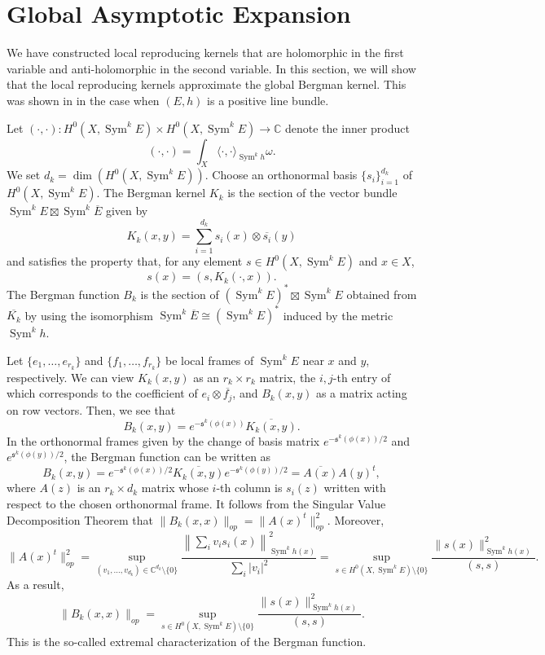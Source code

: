 \documentclass{amsart}
\theoremstyle{definition}
\theoremstyle{remark}
\numberwithin{equation}{section}
\DeclareMathOperator{\Sym}{Sym}
\begin{document}
\section{Global Asymptotic Expansion}

We have constructed local reproducing kernels that are holomorphic in the first variable and anti-holomorphic in the second variable. In this section, we will show that the local reproducing kernels approximate the global Bergman kernel. This was shown in \cite{BBS} in the case when $(E,h)$ is a positive line bundle. 

Let $(\cdot, \cdot): H^0(X,\Sym^kE) \times H^0(X,\Sym^kE) \to \mathbb{C}$ denote the inner product
$$
(\cdot, \cdot) = \int_X \langle \cdot, \cdot \rangle_{\Sym^kh} \omega.
$$
We set $d_k = \dim(H^0 (X, \Sym^k E))$. Choose an orthonormal basis $\{s_i\}_{i=1}^{d_k}$ of $H^0(X,\Sym^kE)$. The Bergman kernel $K_k$ is the section of the vector bundle $\Sym^k E \boxtimes \Sym^k \overline{E}$ given by
$$
K_k(x,y) = \sum_{i=1}^{d_k} s_i(x) \otimes \overline{s_i}(y)
$$
and satisfies the property that, for any element $s \in H^0(X,\Sym^kE)$ and $x \in X$,
$$
s(x) = (s, K_k(\cdot,x)).
$$
The Bergman function $B_k$ is the section of $(\Sym^kE)^* \boxtimes \Sym^kE$ obtained from $\overline{K_k}$ by using the isomorphism $\Sym^k \overline{E} \cong (\Sym^k E)^*$ induced by the metric $\Sym^k h$.

Let $\{e_1, \dotsc, e_{r_k}\}$ and $\{f_1, \dotsc, f_{r_k}\}$ be local frames of $\Sym^kE$ near $x$ and $y$, respectively. We can view $K_k(x,y)$ as an $r_k \times r_k$ matrix, the $i,j$-th entry of which corresponds to the coefficient of $e_i \otimes \overline{f_j}$, and $B_k(x,y)$ as a matrix acting on row vectors. Then, we see that 
$$
B_k(x,y) =  e^{-\mathfrak{s}^k(\phi(x))} \overline{K_k(x,y)} .
$$
In the orthonormal frames given by the change of basis matrix $e^{-\mathfrak{s}^k(\phi(x))/2}$ and $e^{\mathfrak{s}^k(\phi(y))/2}$, the Bergman function can be written as
\begin{equation} \label{eq : AA^*}
B_k(x,y) = e^{-\mathfrak{s}^k(\phi(x))/2} \overline{K_k(x,y)} e^{-\mathfrak{s}^k(\phi(y))/2} = \overline{A(x)}A(y)^t,
\end{equation}
where $A(z)$ is an $r_k \times d_k$ matrix whose $i$-th column is $s_i(z)$ written with respect to the chosen orthonormal frame. It follows from the Singular Value Decomposition Theorem that $\|B_k(x,x)\|_{op} = \|A(x)^t\|_{op}^2$. Moreover,
$$
\|A(x)^t\|_{op}^2 = \sup_{(v_1, \dotsc, v_{d_k}) \in \mathbb{C}^{d_k}\setminus \{0\}} \frac{ \left \| \sum_i v_is_i(x) \right \|_{\Sym^kh(x)}^2}{\sum_i |v_i|^2} = \sup_{s \in H^0(X,\Sym^kE)\setminus \{0\}} \frac{ \|s(x)\|_{\Sym^kh(x)}^2}{(s,s)}.
$$
As a result,
\begin{equation} \label{eq: extremal char}
\|B_k(x,x)\|_{op} = \sup_{s \in H^0(X,\Sym^kE) \setminus \{0\}} \frac{\|s(x)\|_{\Sym^kh(x)}^2}{(s,s)}.
\end{equation}
This is the so-called extremal characterization of the Bergman function.
\end{document}
